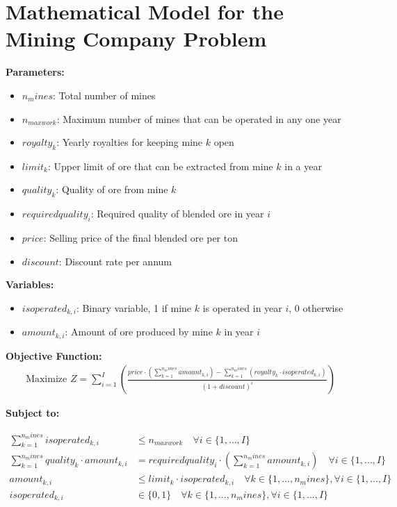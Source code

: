 \documentclass{article}
\begin{document}
\section*{Mathematical Model for the Mining Company Problem}

\textbf{Parameters:}
\begin{itemize}
    \item \( n_mines \): Total number of mines
    \item \( n_{maxwork} \): Maximum number of mines that can be operated in any one year
    \item \( royalty_k \): Yearly royalties for keeping mine \( k \) open
    \item \( limit_k \): Upper limit of ore that can be extracted from mine \( k \) in a year
    \item \( quality_k \): Quality of ore from mine \( k \)
    \item \( requiredquality_i \): Required quality of blended ore in year \( i \)
    \item \( price \): Selling price of the final blended ore per ton
    \item \( discount \): Discount rate per annum
\end{itemize}

\textbf{Variables:}
\begin{itemize}
    \item \( isoperated_{k,i} \): Binary variable, 1 if mine \( k \) is operated in year \( i \), 0 otherwise
    \item \( amount_{k,i} \): Amount of ore produced by mine \( k \) in year \( i \)
\end{itemize}

\textbf{Objective Function:}
\begin{align*}
    \text{Maximize } Z = \sum_{i=1}^{I} \left( \frac{price \cdot \left( \sum_{k=1}^{n_mines} amount_{k,i} \right) - \sum_{k=1}^{n_mines} (royalty_k \cdot isoperated_{k,i})}{(1 + discount)^{i}} \right)
\end{align*}

\textbf{Subject to:}

\begin{align}
    \sum_{k=1}^{n_mines} isoperated_{k,i} & \leq n_{maxwork} \quad \forall i \in \{1, \ldots, I\} \label{eq:work_limit} \\
    \sum_{k=1}^{n_mines} quality_k \cdot amount_{k,i} &= requiredquality_i \cdot \left( \sum_{k=1}^{n_mines} amount_{k,i} \right) \quad \forall i \in \{1, \ldots, I\} \label{eq:quality_constraint} \\
    amount_{k,i} & \leq limit_k \cdot isoperated_{k,i} \quad \forall k \in \{1, \ldots, n_mines\}, \forall i \in \{1, \ldots, I\} \label{eq:production_limit} \\
    isoperated_{k,i} & \in \{0, 1\} \quad \forall k \in \{1, \ldots, n_mines\}, \forall i \in \{1, \ldots, I\} \label{eq:binary}
\end{align}
\end{document}
